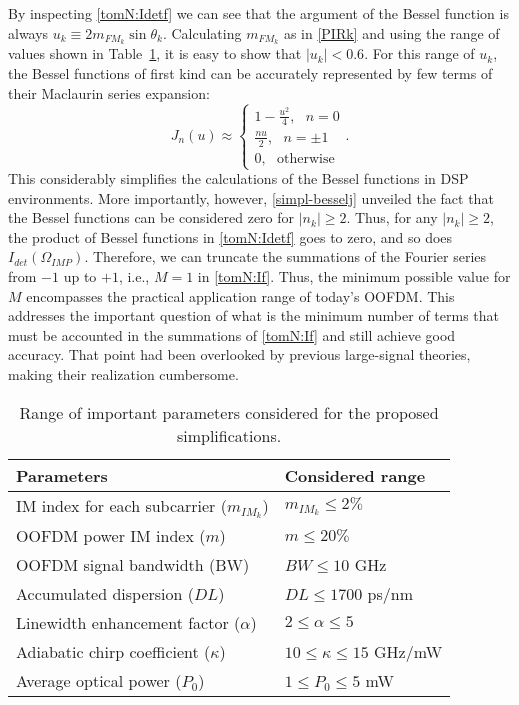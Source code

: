 \documentclass[journal]{IEEEtran}
\begin{document}
By inspecting \eqref{tomN:Idetf} we can see that the argument of the Bessel function is always $u_k \equiv 2m_{FM_k}\sin{\theta_k}$. Calculating $m_{FM_k}$ as in \eqref{PIRk} and using the range of values shown in Table~\ref{tab:param}, it is easy to show that $|u_k| < 0.6$. For this range of $u_k$, the Bessel functions of first kind can be accurately represented by few terms of their Maclaurin series expansion:
\setcounter{equation}{4}
\begin{equation} \label{simpl-besselj}
J_n(u) \approx
\begin{cases} 
1 - \frac{u^2}{4},~~~n = 0 \\
\frac{nu}{2},~~~n = \pm 1 \\
0,~~~\text{otherwise}
\end{cases}.
\end{equation}
This considerably simplifies the calculations of the Bessel functions in DSP environments. More importantly, however, \eqref{simpl-besselj} unveiled the fact that the Bessel functions can be considered zero for $|n_k|\geq 2$. Thus, for any $|n_k| \geq 2$, the product of Bessel functions in \eqref{tomN:Idetf} goes to zero, and so does $I_{det}(\Omega_{IMP})$. Therefore, we can truncate the summations of the Fourier series from $-1$ up to $+1$, i.e., $M = 1$ in \eqref{tomN:If}. Thus, the minimum possible value for $M$ encompasses the practical application range of today's OOFDM. This addresses the important question of what is the minimum number of terms that must be accounted in the summations of \eqref{tomN:If} and still achieve good accuracy. That point had been overlooked by previous large-signal theories, making their realization cumbersome.
\begin{table}[t]
\caption{Range of important parameters considered for the proposed simplifications.}
\label{tab:param}
\centering
\begin{tabular}{l|l}
\hline
Parameters & Considered range \\
\hline
IM index for each subcarrier ($m_{IM_k}$)   		   & $m_{IM_k} \leq 2\%$     \\
OOFDM power IM index ($m$) & $m \leq 20\%$ \\
OOFDM signal bandwidth (BW) & $BW \leq 10$ GHz \\
Accumulated dispersion ($DL$)  								& $DL \leq 1700$ ps/nm    \\
Linewidth enhancement factor ($\alpha$)&  $2 \leq \alpha \leq 5$   \\
Adiabatic chirp coefficient ($\kappa$)  & 	$10 \leq \kappa \leq 15$ GHz/mW     \\
Average optical power ($P_0$)														 &  $1 \leq P_0 \leq 5$ mW \\
\hline
\end{tabular}
\end{table}
\end{document}
